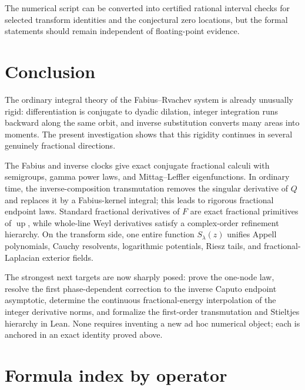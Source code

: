 \documentclass[11pt,oneside]{article}
\theoremstyle{definition}
\theoremstyle{remark}
\newcommand{\Up}{\operatorname{up}}
\newcommand{\1}{\mathbf 1}
\begin{document}
The numerical script can be converted into certified rational interval checks
for selected transform identities and the conjectural zero locations, but the
formal statements should remain independent of floating-point evidence.

\section{Conclusion}

The ordinary integral theory of the Fabius--Rvachev system is already unusually
rigid: differentiation is conjugate to dyadic dilation, integer integration
runs backward along the same orbit, and inverse substitution converts many
areas into moments.  The present investigation shows that this rigidity
continues in several genuinely fractional directions.

The Fabius and inverse clocks give exact conjugate fractional calculi with
semigroups, gamma power laws, and Mittag--Leffler eigenfunctions.  In ordinary
time, the inverse-composition transmutation removes the singular derivative of
$Q$ and replaces it by a Fabius-kernel integral; this leads to rigorous
fractional endpoint laws.  Standard fractional derivatives of $F$ are exact
fractional primitives of $\Up$, while whole-line Weyl derivatives satisfy a
complex-order refinement hierarchy.  On the transform side, one entire
function $S_\lambda(z)$ unifies Appell polynomials, Cauchy resolvents, logarithmic
potentials, Riesz tails, and fractional-Laplacian exterior fields.

The strongest next targets are now sharply posed: prove the one-node law,
resolve the first phase-dependent correction to the inverse Caputo endpoint
asymptotic, determine the continuous fractional-energy interpolation of the
integer derivative norms, and formalize the first-order transmutation and
Stieltjes hierarchy in Lean.  None requires inventing a new ad hoc numerical
object; each is anchored in an exact identity proved above.

\appendix

\section{Formula index by operator}
\end{document}
